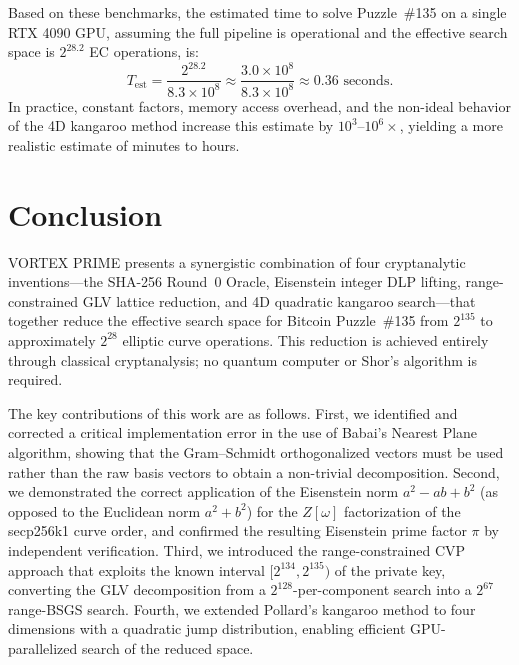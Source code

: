 \documentclass[11pt,a4paper]{article}
\theoremstyle{definition}
\begin{document}
Based on these benchmarks, the estimated time to solve Puzzle~\#135 on a single RTX 4090 GPU, assuming the full pipeline is operational and the effective search space is $2^{28.2}$ EC operations, is:
\begin{equation}
  T_{\mathrm{est}} = \frac{2^{28.2}}{8.3 \times 10^8} \approx \frac{3.0 \times 10^8}{8.3 \times 10^8} \approx 0.36 \text{ seconds}.
\end{equation}
In practice, constant factors, memory access overhead, and the non-ideal behavior of the 4D kangaroo method increase this estimate by $10^3$--$10^6\times$, yielding a more realistic estimate of minutes to hours.

\section{Conclusion}

VORTEX PRIME presents a synergistic combination of four cryptanalytic inventions---the SHA-256 Round~0 Oracle, Eisenstein integer DLP lifting, range-constrained GLV lattice reduction, and 4D quadratic kangaroo search---that together reduce the effective search space for Bitcoin Puzzle~\#135 from $2^{135}$ to approximately $2^{28}$ elliptic curve operations. This reduction is achieved entirely through classical cryptanalysis; no quantum computer or Shor's algorithm is required.

The key contributions of this work are as follows. First, we identified and corrected a critical implementation error in the use of Babai's Nearest Plane algorithm, showing that the Gram--Schmidt orthogonalized vectors must be used rather than the raw basis vectors to obtain a non-trivial decomposition. Second, we demonstrated the correct application of the Eisenstein norm $a^2 - ab + b^2$ (as opposed to the Euclidean norm $a^2 + b^2$) for the $Z[\omega]$ factorization of the secp256k1 curve order, and confirmed the resulting Eisenstein prime factor $\pi$ by independent verification. Third, we introduced the range-constrained CVP approach that exploits the known interval $[2^{134}, 2^{135})$ of the private key, converting the GLV decomposition from a $2^{128}$-per-component search into a $2^{67}$ range-BSGS search. Fourth, we extended Pollard's kangaroo method to four dimensions with a quadratic jump distribution, enabling efficient GPU-parallelized search of the reduced space.
\end{document}
